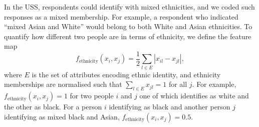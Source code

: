 \documentclass{scrartcl}
\newcommand{\abs}[1]{\left|#1\right|}
\begin{document}
In the USS, respondents could identify with mixed ethnicities, and we coded such responses as a mixed membership. For example, a respondent who indicated ``mixed Asian and White'' would belong to both White and Asian ethnicities. To quantify how different two people are in terms of ethnicity, we define the feature map
\begin{equation*}
    f_\text{ethnicity}(x_i, x_j) = \frac{1}{2} \sum_{l\in E}\abs{x_{il}-x_{jl}},
\end{equation*}
where $E$ is the set of attributes encoding ethnic identity, and ethnicity memberships are normalised such that $\sum_{l\in E}x_{jl}=1$ for all $j$. For example, $f_\text{ethnicity}(x_i, x_j)=1$ for two people $i$ and $j$ one of which identifies as white and the other as black. For a person $i$ identifying as black and another person $j$ identifying as mixed black and Asian, $f_\text{ethnicity}(x_i, x_j)=0.5$.
\end{document}
